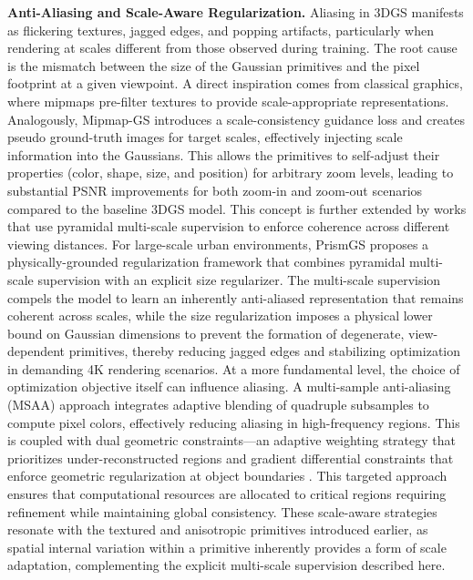 \documentclass[11pt]{article}
\begin{document}
\textbf{Anti-Aliasing and Scale-Aware Regularization.} Aliasing in 3DGS manifests as flickering textures, jagged edges, and popping artifacts, particularly when rendering at scales different from those observed during training. The root cause is the mismatch between the size of the Gaussian primitives and the pixel footprint at a given viewpoint. A direct inspiration comes from classical graphics, where mipmaps pre-filter textures to provide scale-appropriate representations. Analogously, Mipmap-GS \cite{ref72} introduces a scale-consistency guidance loss and creates pseudo ground-truth images for target scales, effectively injecting scale information into the Gaussians. This allows the primitives to self-adjust their properties (color, shape, size, and position) for arbitrary zoom levels, leading to substantial PSNR improvements for both zoom-in and zoom-out scenarios compared to the baseline 3DGS model. This concept is further extended by works that use pyramidal multi-scale supervision to enforce coherence across different viewing distances. For large-scale urban environments, PrismGS \cite{ref73} proposes a physically-grounded regularization framework that combines pyramidal multi-scale supervision with an explicit size regularizer. The multi-scale supervision compels the model to learn an inherently anti-aliased representation that remains coherent across scales, while the size regularization imposes a physical lower bound on Gaussian dimensions to prevent the formation of degenerate, view-dependent primitives, thereby reducing jagged edges and stabilizing optimization in demanding 4K rendering scenarios. At a more fundamental level, the choice of optimization objective itself can influence aliasing. A multi-sample anti-aliasing (MSAA) approach integrates adaptive blending of quadruple subsamples to compute pixel colors, effectively reducing aliasing in high-frequency regions. This is coupled with dual geometric constraints---an adaptive weighting strategy that prioritizes under-reconstructed regions and gradient differential constraints that enforce geometric regularization at object boundaries \cite{ref74}. This targeted approach ensures that computational resources are allocated to critical regions requiring refinement while maintaining global consistency. These scale-aware strategies resonate with the textured and anisotropic primitives introduced earlier, as spatial internal variation within a primitive inherently provides a form of scale adaptation, complementing the explicit multi-scale supervision described here.
\end{document}
